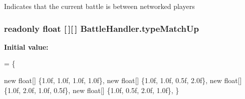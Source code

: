 Indicates that the current battle is between networked players 

\hypertarget{group__client_gaaa33e18e5c8a07eea1a78986ada6a7b5}{
\subsubsection[{type\-Match\-Up}]{\setlength{\rightskip}{0pt plus 5cm}readonly float \mbox{[}$\,$\mbox{]}\mbox{[}$\,$\mbox{]} Battle\-Handler.\-type\-Match\-Up}}\label{group__client_gaaa33e18e5c8a07eea1a78986ada6a7b5}
{\bfseries Initial value\-:}
\begin{DoxyCode}
=
    \{
        
        \textcolor{keyword}{new} \textcolor{keywordtype}{float}[] \{1.0f,  1.0f,   1.0f,   1.0f\}, 
        \textcolor{keyword}{new} \textcolor{keywordtype}{float}[] \{1.0f,  1.0f,   0.5f,   2.0f\}, 
        \textcolor{keyword}{new} \textcolor{keywordtype}{float}[] \{1.0f,  2.0f,   1.0f,   0.5f\}, 
        \textcolor{keyword}{new} \textcolor{keywordtype}{float}[] \{1.0f,  0.5f,   2.0f,   1.0f\}, 
    \}
\end{DoxyCode}

